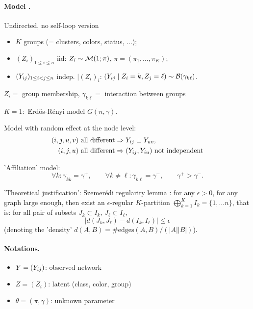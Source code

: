 \subsection{\SBMo}


\jump \paragraph{Model \citep{HoL79,NoS01}.} Undirected, no self-loop version
\begin{itemize}
\item $K$ groups (= clusters, colors, status, ...);
\item $(Z_i)_{1 \leq i \leq n}$ iid: 
$Z_i \sim \mathcal{M}(1; \pi)$, $\pi = (\pi_1, \dots, \pi_K)$;
\item $({Y_{ij}})_{1 \leq i < j \leq n}$ indep. $\mid (Z_i)_i$: 
$({Y_{ij}} \mid Z_i=k, Z_j=\ell) \sim \mathcal{B}(\gamma_{k\ell})$.
\end{itemize}

\ra $Z_i =$ group membership, $\gamma_{k\ell} =$ interaction between groups

\ra $K = 1:$ Erd\"os-R\'enyi model $G(n, \gamma)$.

\ra Model with random effect at the node level:
\begin{align*}
(i, j, u, v) \text{ all different} & \Rightarrow {Y_{ij}} \perp Y_{uv}, \\
(i, j, u) \text{ all different} & \Rightarrow ({Y_{ij}}, Y_{iu}) \text{ not independent}
\end{align*}

\ra 'Affiliation' model:
$$
\forall k: \gamma_{kk} = \gamma^+, \qquad 
\forall k\neq \ell: \gamma_{k\ell} = \gamma^-, \qquad 
\gamma^+ > \gamma^-.
$$


\ra 'Theoretical justification': Szemer\'edi regularity lemma \citep{Sze75}: for any $\epsilon > 0$, for any graph large enough, then exist an $\epsilon$-regular $K$-partition $\bigoplus_{k=1}^K I_k = \{1, \dots n\}$, that is: for all pair of subsets $J_k \subset I_k$,  $J_\ell \subset I_\ell$, 
$$
|d(J_k, J_\ell) - d(I_k, I_\ell)| \leq \epsilon
$$ 
(denoting the 'density' $d(A, B) = \# \text{edges}(A, B)/ (|A| |B|)$).

\jump \paragraph{Notations.} 
\begin{itemize}
\item $Y = ({Y_{ij}})$: observed network
\item $Z = (Z_i)$: latent (class, color, group)
\item $\theta = (\pi, \gamma)$: unknown parameter
\end{itemize}

